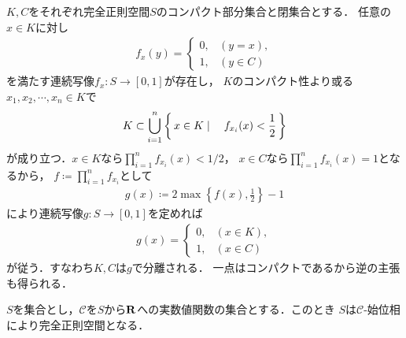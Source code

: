 	\begin{prf}
		$K,C$をそれぞれ完全正則空間$S$のコンパクト部分集合と閉集合とする．
		任意の$x \in K$に対し
		\begin{align}
			f_x(y) = 
			\begin{cases}
				0, & (y=x), \\
				1, & (y \in C)
			\end{cases} 
		\end{align}
		を満たす連続写像$f_x:S \longrightarrow [0,1]$が存在し，
		$K$のコンパクト性より或る$x_1,x_2,\cdots,x_n \in K$で
		\begin{align}
			K \subset \bigcup_{i=1}^n \left\{\, x \in K \mid \quad f_{x_i}(x) < \frac{1}{2}\, \right\}
		\end{align}
		が成り立つ．$x \in K$なら$\prod_{i=1}^n f_{x_i}(x) < 1/2$，
		$x \in C$なら$\prod_{i=1}^n f_{x_i}(x) = 1$となるから，
		$f \coloneqq \prod_{i=1}^n f_{x_i}$として
		\begin{align}
			g(x) \coloneqq 2 \operatorname{max}\left\{f(x),\frac{1}{2}\right\} - 1
		\end{align}
		により連続写像$g:S \longrightarrow [0,1]$を定めれば
		\begin{align}
			g(x) = 
			\begin{cases}
				0, & (x \in K), \\
				1, & (x \in C)
			\end{cases}
		\end{align}
		が従う．すなわち$K,C$は$g$で分離される．
		一点はコンパクトであるから逆の主張も得られる．
		\QED
	\end{prf}
	
	\begin{screen}
		\begin{thm}[実数値関数の族が生成する始位相は完全正則]
		\label{thm:initial_topology_of_continuous_functions_is_completely_regular}
			$S$を集合とし，$\mathscr{C}$を$S$から$\mathbf{R}$への実数値関数の集合とする．このとき
			$S$は$\mathscr{C}$-始位相により完全正則空間となる．
		\end{thm}
	\end{screen}
	
